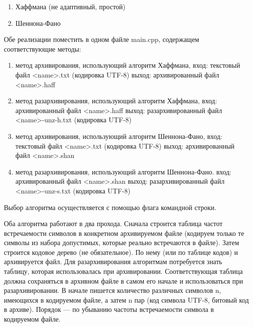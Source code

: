 \documentclass[russian, a4paper, 12pt]{article}
\begin{document}
\begin{enumerate}
  \item Хаффмана (не адаптивный, простой)
  \item Шеннона-Фано
\end{enumerate}
Обе реализации поместить в одном файле main.cpp, содержащем соответствующие методы:
\begin{enumerate}
  \item метод архивирования, использующий алгоритм Хаффмана,
  вход: текстовый файл <name>.txt (кодировка UTF-8)
  выход: архивированный файл <name>.haff
  \item метод разархивирования, использующий алгоритм Хаффмана,
  вход: архивированный файл <name>.haff
  выход: разархивированный файл <name>-unz-h.txt (кодировка UTF-8)
  \item метод архивирования, использующий алгоритм Шеннона-Фано,
  вход: текстовый файл <name>.txt (кодировка UTF-8)
  выход: архивированный файл <name>.shan
  \item метод разархивирования, использующий алгоритм Шеннона-Фано.
  вход: архивированный файл <name>.shan
  выход: разархивированный файл <name>-unz-s.txt (кодировка UTF-8)
\end{enumerate}

Выбор алгоритма осуществляется с помощью флага командной строки.

Оба алгоритма работают в два прохода. Сначала строится таблица частот
встречаемости символов в конкретном архивируемом файле (кодируем только те
символы из набора допустимых, которые реально встречаются в файле).
Затем строится кодовое дерево (не обязательное).
По нему (или по таблице кодов) и архивируется файл. Для
разархивирования алгоритмам потребуется знать таблицу, которая использовалась
при архивировании. Соответствующая таблица должна сохраняться в архивном файле
в самом его начале и использоваться при разархивировании. В начале пишется
количество различных символов n, имеющихся в кодируемом файле, а затем n пар (код
символа UTF-8, битовый код в архиве). Порядок — по убыванию частоты встречаемости
символа в кодируемом файле.
\end{document}
